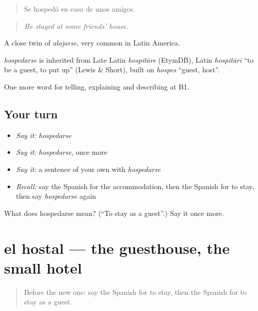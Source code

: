 \begin{quote}
Se hospedó en casa de unos amigos.
\end{quote}

\begin{quote}
\emph{He stayed at some friends’ house.}
\end{quote}

A close twin of \emph{alojarse}, very common in Latin America.

\begin{cousinweb}
\emph{hospedarse} is inherited from Late Latin \emph{hospitāre} (EtymDB), Latin \emph{hospitārī} \textquotedblleft{}to be a guest, to put up\textquotedblright{} (Lewis \& Short), built on \emph{hospes} \textquotedblleft{}guest, host\textquotedblright{}.
\end{cousinweb}

\begin{grammarlens}[title={What you've built}]
One more word for telling, explaining and describing at B1.
\end{grammarlens}

\subsection*{Your turn}
\begin{itemize}
\raggedright
  \item \emph{Say it:} \emph{hospedarse}
  \item \emph{Say it:} \emph{hospedarse}, once more
  \item \emph{Say it:} a sentence of your own with \emph{hospedarse}
  \item \emph{Recall:} say the Spanish for the accommodation, then the Spanish for to stay, then say \emph{hospedarse} again
\end{itemize}

\begin{tcolorbox}[breakable,colback=teal!4,colframe=teal!35!black,title={Before you move on}]
What does hospedarse mean? (\textquotedblleft{}To stay as a guest\textquotedblright{}.) Say it once more.
\end{tcolorbox}
\section[el hostal]{el hostal — the guesthouse, the small hotel}

\label{lesson:ES-C660-hostal}



\begin{quote}
Before the new one: say the Spanish for to stay, then the Spanish for to stay as a guest.
\end{quote}

